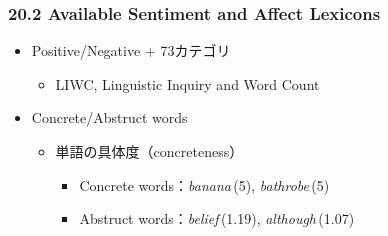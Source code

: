 \begin{frame}
    \frametitle{20.2 Available Sentiment and Affect Lexicons}
    \begin{itemize}
        \item Positive/Negative + 73カテゴリ
        \begin{itemize}
            \item LIWC, Linguistic Inquiry and Word Count 
        \end{itemize}
    \end{itemize}
    \begin{itemize}
        \item Concrete/Abstruct words 
        \begin{itemize}
            \item 単語の具体度（concreteness）
            \begin{itemize}
                \item Concrete words：\textit{banana}\,(5), \textit{bathrobe}\,(5)
                \item Abstruct words：\textit{belief}\,(1.19), \textit{although}\,(1.07)
            \end{itemize}
        \end{itemize}
    \end{itemize}
\end{frame}
